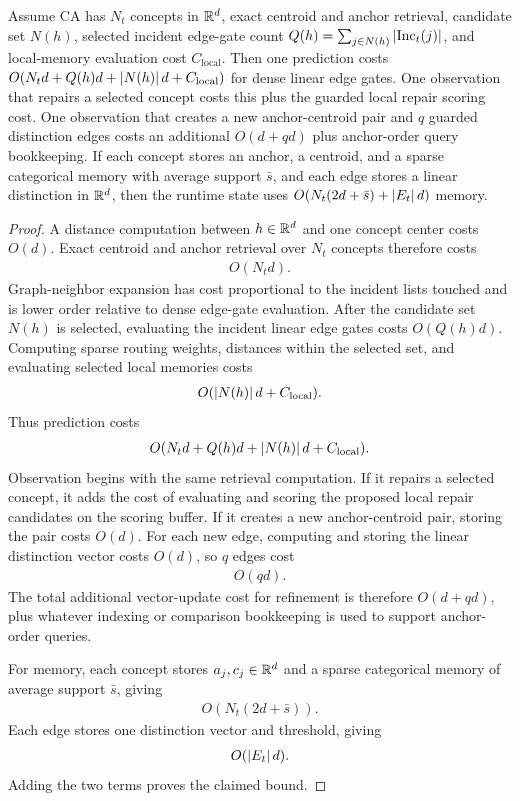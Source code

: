 \begin{theorem}
\label{thm:dgm-complexity:formal}
Assume CA has $N_t$ concepts in $\mathbb{R}^d$, exact centroid and anchor retrieval, candidate set $N(h)$, selected incident edge-gate count $Q(h)=\sum_{j\in N(h)}\left\lvert\operatorname{Inc}_t(j)\right\rvert$, and local-memory evaluation cost $C_{\mathrm{local}}$. Then one prediction costs $O(N_td+Q(h)d+\left\lvert N(h)\right\rvert d+C_{\mathrm{local}})$ for dense linear edge gates. One observation that repairs a selected concept costs this plus the guarded local repair scoring cost. One observation that creates a new anchor-centroid pair and $q$ guarded distinction edges costs an additional $O(d+qd)$ plus anchor-order query bookkeeping. If each concept stores an anchor, a centroid, and a sparse categorical memory with average support $\bar s$, and each edge stores a linear distinction in $\mathbb{R}^d$, then the runtime state uses $O(N_t(2d+\bar s)+\left\lvert E_t\right\rvert d)$ memory.
\end{theorem}
\begin{proof}
A distance computation between $h\in\mathbb{R}^d$ and one concept center costs $O(d)$. Exact centroid and anchor retrieval over $N_t$ concepts therefore costs
\begin{align*}
O(N_td).
\end{align*}
Graph-neighbor expansion has cost proportional to the incident lists touched and is lower order relative to dense edge-gate evaluation. After the candidate set $N(h)$ is selected, evaluating the incident linear edge gates costs $O(Q(h)d)$. Computing sparse routing weights, distances within the selected set, and evaluating selected local memories costs
\begin{align*}
O(\left\lvert N(h)\right\rvert d+C_{\mathrm{local}}).
\end{align*}
Thus prediction costs
\begin{align*}
O(N_td+Q(h)d+\left\lvert N(h)\right\rvert d+C_{\mathrm{local}}).
\end{align*}
Observation begins with the same retrieval computation. If it repairs a selected concept, it adds the cost of evaluating and scoring the proposed local repair candidates on the scoring buffer. If it creates a new anchor-centroid pair, storing the pair costs $O(d)$. For each new edge, computing and storing the linear distinction vector costs $O(d)$, so $q$ edges cost
\begin{align*}
O(qd).
\end{align*}
The total additional vector-update cost for refinement is therefore $O(d+qd)$, plus whatever indexing or comparison bookkeeping is used to support anchor-order queries.

For memory, each concept stores $a_j,c_j\in\mathbb{R}^d$ and a sparse categorical memory of average support $\bar s$, giving
\begin{align*}
O(N_t(2d+\bar s)).
\end{align*}
Each edge stores one distinction vector and threshold, giving
\begin{align*}
O(\left\lvert E_t\right\rvert d).
\end{align*}
Adding the two terms proves the claimed bound.
\end{proof}

